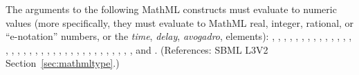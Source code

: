 The arguments to the following MathML constructs must evaluate to numeric
values (more specifically, they must evaluate to MathML real, integer,
rational, or ``e-notation'' numbers, or the \emph{time}, \emph{delay},
\emph{avogadro},   elements): , ,
, , , ,
, , , ,
, , , ,
, , , , ,
, , , , ,
, , , , ,
, , , , ,
, , and .  (References: SBML L3V2
Section~\ref{sec:mathmltype}.)

